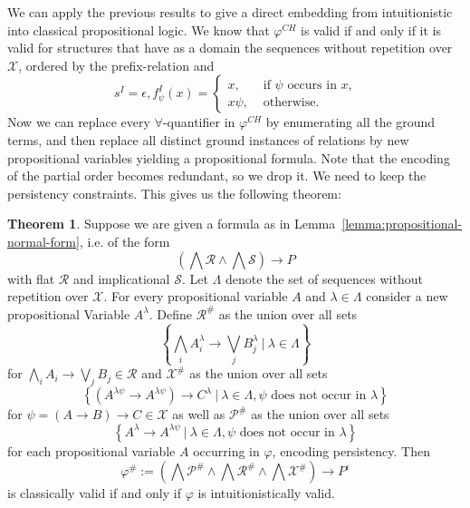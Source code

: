 \documentclass{easychair}
\theoremstyle{definition}
\newtheorem{theorem}{Theorem}[section]
\theoremstyle{definition}
\theoremstyle{definition}
\theoremstyle{definition}
\theoremstyle{definition}
\theoremstyle{definition}
\theoremstyle{definition}
\begin{document}
We can apply the previous results to give a direct embedding from intuitionistic into classical propositional logic. We know that $\varphi^{CH}$ is valid if and only if it is valid for structures that have as a domain the sequences without repetition over $\mathcal X$, ordered by the prefix-relation and $$s^I = \epsilon, f_\psi^I(x) = \begin{cases}
	x, &\text{ if $\psi$ occurs in $x$,}\\
	x\psi, &\text{ otherwise.}
\end{cases}$$
Now we can replace every $\forall$-quantifier in $\varphi^{CH}$ by enumerating all the ground terms, and then replace all distinct ground instances of relations by new propositional variables yielding a propositional formula. Note that the encoding of the partial order becomes redundant, so we drop it. We need to keep the persistency constraints. This gives us the following theorem:

\begin{theorem}\label{thm:prop-translation}
	Suppose we are given a formula as in Lemma~\ref{lemma:propositional-normal-form}, i.e. of the form
	$$\left(\bigwedge\mathcal R\wedge\bigwedge\mathcal S\right)\to P$$
	with flat $\mathcal R$ and implicational $\mathcal S$. Let $\Lambda$ denote the set of sequences without repetition over $\mathcal X$. For every propositional variable $A$ and $\lambda\in\Lambda$ consider a new propositional Variable $A^\lambda$. Define $\mathcal R^\#$ as the union over all sets
	$$
		\left\{\bigwedge_iA_i^\lambda\to\bigvee_jB_j^\lambda\:|\:\lambda\in\Lambda\right\}
	$$
	for $\bigwedge_iA_i\to\bigvee_jB_j\in\mathcal R$ and $\mathcal X^\#$ as the union over all sets
	$$
		\left\{\left(A^{\lambda\psi} \to A^{\lambda\psi}\right)\to C^\lambda\:|\:\lambda\in\Lambda, \psi\text{ does not occur in }\lambda\right\}
	$$
	for $\psi = (A\to B)\to C\in\mathcal X$ as well as $\mathcal P^\#$ as the union over all sets
	$$
		\left\{A^\lambda\to A^{\lambda\psi}\:|\:\lambda\in\Lambda, \psi\text{ does not occur in }\lambda\right\}
	$$
	 for each propositional variable $A$ occurring in $\varphi$, encoding persistency. Then
	$$
		\varphi^\# := \left(\bigwedge \mathcal P^\#\wedge\bigwedge \mathcal R^\#\wedge\bigwedge\mathcal X^\#\right)\to P^\epsilon
	$$
	is classically valid if and only if $\varphi$ is intuitionistically valid.
\end{theorem}
\end{document}
